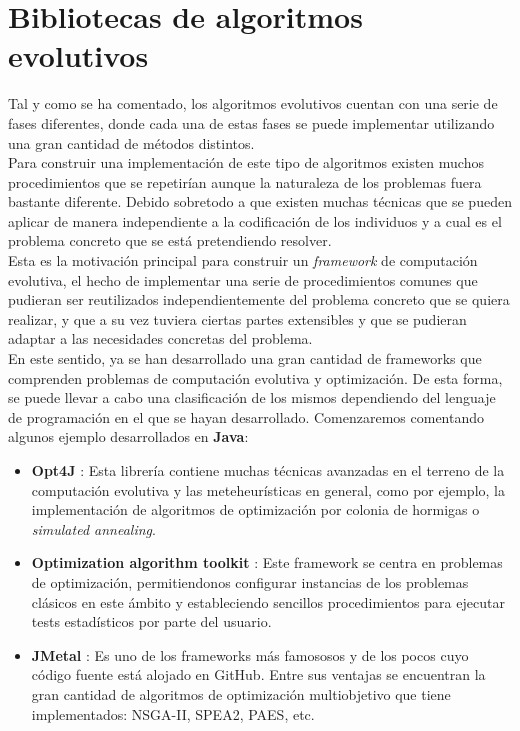 \section{Bibliotecas de algoritmos evolutivos}
\label{1:sec:4}

Tal y como se ha comentado, los algoritmos evolutivos cuentan con una serie de fases diferentes, donde cada una de estas fases se puede implementar utilizando una gran cantidad de métodos distintos.\\

Para construir una implementación de este tipo de algoritmos existen muchos procedimientos que se repetirían aunque la naturaleza de los problemas fuera bastante diferente. Debido sobretodo a que existen muchas técnicas que se pueden aplicar de manera independiente a la codificación de los individuos y a cual es el problema concreto que se está pretendiendo resolver. \\

Esta es la motivación principal para construir un \textit{framework} de computación evolutiva, el hecho de implementar una serie de procedimientos comunes que pudieran ser reutilizados independientemente del problema concreto que se quiera realizar, y que a su vez tuviera ciertas partes extensibles y que se pudieran adaptar a las necesidades concretas del problema. \\

En este sentido, ya se han desarrollado una gran cantidad de frameworks que comprenden problemas de computación evolutiva y optimización. De esta forma, se puede llevar a cabo una clasificación de los mismos dependiendo del lenguaje de programación en el que se hayan desarrollado. Comenzaremos comentando algunos ejemplo desarrollados en \textbf{Java}:

\begin{itemize}
    \item \textbf{Opt4J} \cite{lukasiewycz2009opt4j}: Esta librería contiene muchas técnicas avanzadas en el terreno de la computación evolutiva y las meteheurísticas en general, como por ejemplo, la implementación de algoritmos de optimización por colonia de hormigas o \textit{simulated annealing}.
    \item \textbf{Optimization algorithm toolkit} \cite{brownlee2007oat}: Este framework se centra en problemas de optimización, permitiendonos configurar instancias de los problemas clásicos en este ámbito y estableciendo sencillos procedimientos para ejecutar tests estadísticos por parte del usuario.
    \item \textbf{JMetal} \cite{durillo2011jmetal}: Es uno de los frameworks más famososos y de los pocos cuyo código fuente está alojado en GitHub. Entre sus ventajas se encuentran la gran cantidad de algoritmos de optimización multiobjetivo que tiene implementados:  NSGA-II, SPEA2, PAES, etc.
\end{itemize}

